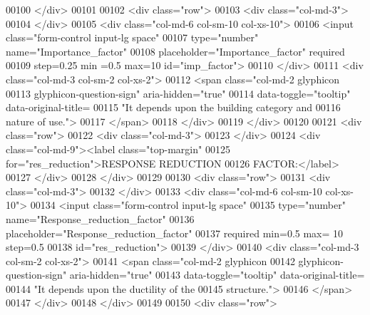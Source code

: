 \begin{DoxyCode}
00100                 </div>
00101 
00102                 <div class="row">
00103                     <div class="col-md-3">
00104                     </div>
00105                     <div class="col-md-6 col-sm-10 col-xs-10">
00106                         <input class="form-control input-lg space"
00107                         type="number" name="Importance\_factor"
00108                         placeholder="Importance\_factor" required 
00109                         step=0.25 min =0.5 max=10 id="imp\_factor">
00110                     </div>
00111                     <div class="col-md-3 col-sm-2 col-xs-2">
00112                         <span class="col-md-2 glyphicon 
00113                             glyphicon-question-sign" aria-hidden="true"
00114                             data-toggle="tooltip" data-original-title=
00115                             "It depends upon the building category and 
00116                             nature of use.">
00117                         </span>
00118                     </div>
00119                 </div>
00120                 
00121                 <div class="row">
00122                     <div class="col-md-3">
00123                     </div>
00124                     <div class="col-md-9"><label class="top-margin"
00125                         for="res\_reduction">RESPONSE REDUCTION
00126                         FACTOR:</label>
00127                     </div>
00128                 </div>
00129                 
00130                 <div class="row">
00131                     <div class="col-md-3">
00132                     </div>
00133                     <div class="col-md-6 col-sm-10 col-xs-10">
00134                         <input class="form-control input-lg space"
00135                         type="number" name="Response\_reduction\_factor"
00136                         placeholder="Response\_reduction\_factor" 
00137                         required min=0.5 max= 10 step=0.5 
00138                         id="res\_reduction">
00139                     </div>
00140                     <div class="col-md-3 col-sm-2 col-xs-2">
00141                         <span class="col-md-2 glyphicon 
00142                             glyphicon-question-sign" aria-hidden="true"
00143                             data-toggle="tooltip" data-original-title=
00144                             "It depends upon the ductility of the 
00145                             structure.">
00146                         </span>
00147                     </div>
00148                 </div>
00149 
00150                 <div class="row">

\end{DoxyCode}
